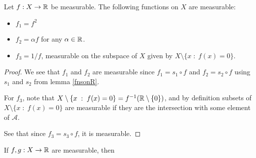 \documentclass{unswmaths}
\begin{document}
\begin{corollary}
    Let $f:X\rightarrow\mathbb{R}$ be measurable. The following functions on $X$ are measurable:
    \begin{itemize}
        \item{} $f_1 = f^2$
        \item{} $f_2 = \alpha f$ for any $\alpha \in \mathbb{R}$.
        \item{} $f_3 = 1/f$, measurable on the subspace of $X$ given by $X\setminus\{x\;:\;f(x) = 0\}$.
    \end{itemize}
\end{corollary}
\begin{proof}
    We see that $f_1$ and $f_2$ are measurable since $f_1 = s_1\circ f$ and $f_2 = s_2 \circ f$ using
    $s_1$ and $s_2$ from lemma \ref{fnsonR}.
    
    For $f_3$, note that $X\setminus\{x\;:\; f(x) = 0\} = f^{-1}(\mathbb{R}\setminus \{0\})$, and by definition
    subsets of $X\setminus \{x\;:\;f(x)=0\}$ are measurable if they are the intersection with some element
    of $\mathcal{A}$.
    
    See that since $f_3 = s_3 \circ f$, it is measurable.
\end{proof}

\begin{lemma}
    If $f,g:X\rightarrow\mathbb{R}$ are measurable, then 
\end{lemma}
\end{document}
